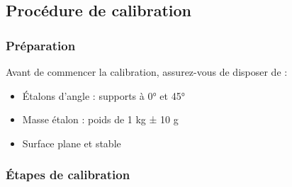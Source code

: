 \documentclass[12pt,a4paper]{article}
\begin{document}
\subsection{Procédure de calibration}

\subsubsection{Préparation}

Avant de commencer la calibration, assurez-vous de disposer de :
\begin{itemize}
    \item Étalons d'angle : supports à 0° et 45°
    \item Masse étalon : poids de 1 kg ± 10 g
    \item Surface plane et stable
\end{itemize}

\subsubsection{Étapes de calibration}
\end{document}
